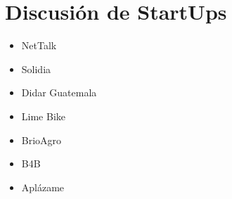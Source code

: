 \section{Discusión de StartUps}
\begin{itemize}
    \item NetTalk 
    \item Solidia 
    \item Didar Guatemala 
    \item Lime Bike 
    \item BrioAgro 
    \item B4B 
    \item Aplázame
\end{itemize}

